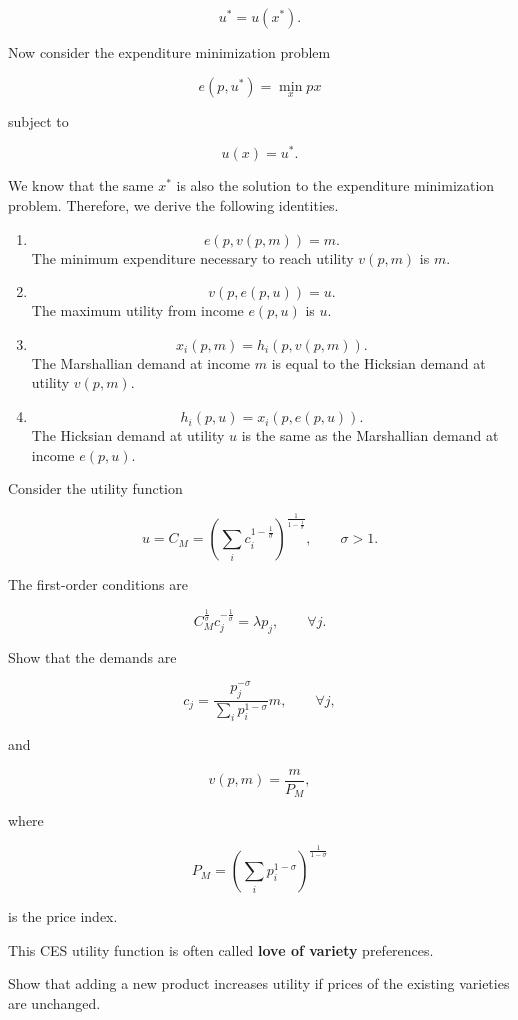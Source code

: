 \[
u^*=u(x^*).
\]

Now consider the expenditure minimization problem

\[
e(p,u^*)
=
\min_x px
\]

subject to

\[
u(x)=u^*.
\]

We know that the same \(x^*\) is also the solution to the expenditure minimization problem. Therefore, we derive the following identities.

\begin{enumerate}
    \item
    \[
    e(p,v(p,m))=m.
    \]
    The minimum expenditure necessary to reach utility \(v(p,m)\) is \(m\).

    \item
    \[
    v(p,e(p,u))=u.
    \]
    The maximum utility from income \(e(p,u)\) is \(u\).

    \item
    \[
    x_i(p,m)=h_i(p,v(p,m)).
    \]
    The Marshallian demand at income \(m\) is equal to the Hicksian demand at utility \(v(p,m)\).

    \item
    \[
    h_i(p,u)=x_i(p,e(p,u)).
    \]
    The Hicksian demand at utility \(u\) is the same as the Marshallian demand at income \(e(p,u)\).
\end{enumerate}

\begin{exercise}

Consider the utility function

\[
u=C_M
=
\left(
\sum_i c_i^{1-\frac{1}{\sigma}}
\right)^{\frac{1}{1-\frac{1}{\sigma}}},
\qquad
\sigma>1.
\]

The first-order conditions are

\[
C_M^{\frac{1}{\sigma}}
c_j^{-\frac{1}{\sigma}}
=
\lambda p_j,
\qquad
\forall j.
\]

Show that the demands are

\[
c_j
=
\frac{p_j^{-\sigma}}{\sum_i p_i^{1-\sigma}}m,
\qquad
\forall j,
\]

and

\[
v(p,m)
=
\frac{m}{P_M},
\]

where

\[
P_M
=
\left(
\sum_i p_i^{1-\sigma}
\right)^{\frac{1}{1-\sigma}}
\]

is the price index.

This CES utility function is often called \textbf{love of variety} preferences.

Show that adding a new product increases utility if prices of the existing varieties are unchanged.
\end{exercise}

